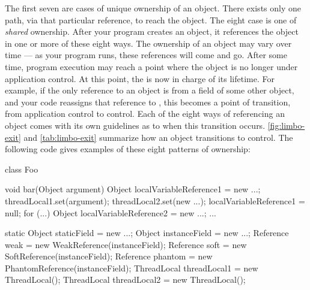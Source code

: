 The first seven are cases of unique ownership of an object. There exists
only one path, via that particular reference, to reach the object. The eight case
is one of \emph{shared} ownership. After your program creates an object, it
references the object in one or more of these eight ways. The ownership of an
object may vary over time --- as your program runs, these references will come
and go. After some time, program execution may reach a point where the object is
no longer under application control. At this point, the \jre is now in charge of
its lifetime. For example, if the only reference to an object is from a field of
some other object, and your code reassigns that reference to , this
becomes a point of transition, from application control to \jre control. Each of
the eight ways of referencing an object comes with its own guidelines as to when
this transition occurs. \autoref{fig:limbo-exit} and \autoref{tab:limbo-exit}
summarize how an object transitions to \jre control. The following code gives
examples of these eight patterns of ownership:
\lstset{numbers=left,numbersep=12pt,numberstyle=\tiny\textsf}
\begin{shortlisting}
class Foo {
   void bar(Object argument) {
      Object localVariableReference1 = new ...;
      threadLocal1.set(argument);
      threadLocal2.set(new ...);
      localVariableReference1 = null;
      for (...) {
         Object localVariableReference2 = new ...;
         ...
      }
   }

   static Object staticField = new ...;
   Object instanceField = new ...;
   Reference weak = new WeakReference(instanceField);
   Reference soft = new SoftReference(instanceField);
   Reference phantom = new PhantomReference(instanceField);
   ThreadLocal threadLocal1 = new ThreadLocal();
   ThreadLocal threadLocal2 = new ThreadLocal();
}
\end{shortlisting}
\lstset{numbers=none}

